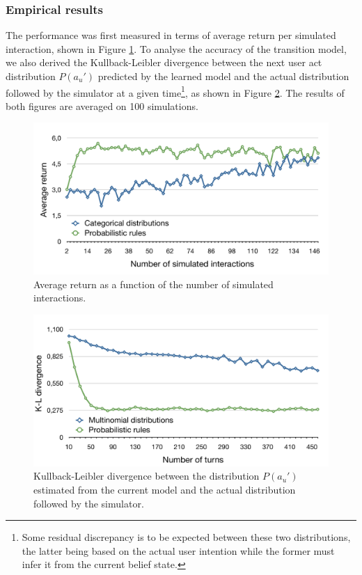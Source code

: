 \subsubsection*{Empirical results}

The performance was first measured in terms of average return per simulated interaction, shown in Figure \ref{fig:return_exp21}.  To analyse the accuracy of the transition model, we also derived the Kullback-Leibler divergence \citep{KLDIVERGE} between the next user act distribution $P(a_u')$ predicted by the learned model and the actual distribution followed by the simulator at a given time\footnote{Some residual discrepancy is to be expected between these two distributions, the latter being based on the actual user intention while the former must infer it from the current belief state.}, as shown in Figure \ref{fig:divergence}.   The results of both figures are averaged on 100 simulations.

\begin{figure}[h]
\centering
\includegraphics[scale=0.40]{imgs/return_exp21.pdf}
\caption{Average return as a function of the number of simulated interactions.}
\label{fig:return_exp21}
\end{figure}

\begin{figure}[h] 
\begin{center}
\includegraphics[scale=0.40]{imgs/kldivergence.pdf}
\end{center} 
\caption{Kullback-Leibler divergence between the distribution $P(a_u')$ estimated from the current model and the actual distribution followed by the simulator.}
\label{fig:divergence}
\end{figure}

